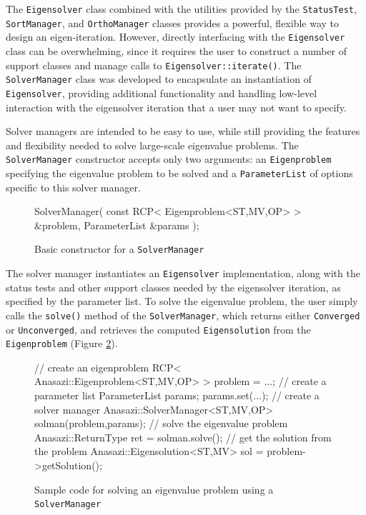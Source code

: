 \documentclass[acmtoms]{acmtrans2m}
\newcommand{\aspace}[1]{\texttt{#1}}
\begin{document}
The \aspace{Eigensolver} class combined with the utilities provided by the \aspace{StatusTest},
\aspace{SortManager}, and \aspace{OrthoManager} classes provides a powerful, flexible way
to design an eigen-iteration.  However, directly interfacing with the \aspace{Eigensolver} class
can be overwhelming, since it requires the user to construct a number of support classes and 
manage calls to \verb!Eigensolver::iterate()!. The \aspace{SolverManager} class was developed to
encapsulate an instantiation of \aspace{Eigensolver}, providing additional functionality
and handling low-level interaction with the eigensolver iteration that a user may not want to
specify. 

Solver managers are intended to be easy to use, while still providing the
features and flexibility needed to solve large-scale eigenvalue problems.
The \aspace{SolverManager} constructor accepts only two arguments:
an \aspace{Eigenproblem} specifying the eigenvalue problem to be solved and a
\texttt{ParameterList} of options specific to this solver manager. 
\begin{figure}[htb]
\begin{center}
\begin{boxedverbatim}
SolverManager(
   const RCP< Eigenproblem<ST,MV,OP> > &problem,
   ParameterList                       &params
 );
\end{boxedverbatim}
\end{center}
\caption{Basic constructor for a \aspace{SolverManager}}
\label{fig:constructor2}
\end{figure}
The solver manager instantiates an \aspace{Eigensolver} implementation, along with the
status tests and other support classes needed by the eigensolver iteration, as
specified by the parameter list. To solve the eigenvalue
problem, the user simply calls the \verb!solve()! method of the \aspace{SolverManager},
which returns either \aspace{Converged} or \aspace{Unconverged}, and retrieves the computed
\aspace{Eigensolution} from the \aspace{Eigenproblem} (Figure \ref{fig:examplesolve}).

\begin{figure}[htb]
\begin{center}
\begin{boxedverbatim}
// create an eigenproblem
RCP< Anasazi::Eigenproblem<ST,MV,OP> > problem = ...;
// create a parameter list
ParameterList params;
params.set(...);
// create a solver manager
Anasazi::SolverManager<ST,MV,OP> solman(problem,params);
// solve the eigenvalue problem
Anasazi::ReturnType ret = solman.solve();
// get the solution from the problem
Anasazi::Eigensolution<ST,MV> sol = problem->getSolution();
\end{boxedverbatim}
\end{center}
\caption{Sample code for solving an eigenvalue problem using a \aspace{SolverManager}}
\label{fig:examplesolve}
\end{figure}
\end{document}
